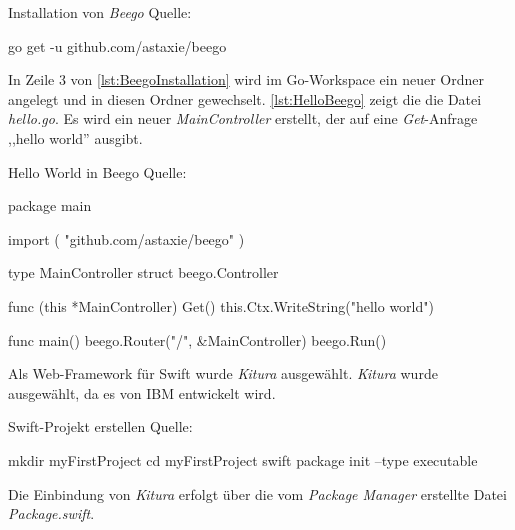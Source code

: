 \begin{listing}[H]
\caption{Installation von \textit{Beego} Quelle:\cite{Beego}}
\label{lst:BeegoInstallation}
\begin{Commandline}
go get -u github.com/astaxie/beego
\end{Commandline}
\end{listing}

In Zeile 3 von \autoref{lst:BeegoInstallation} wird im Go-Workspace ein neuer Ordner angelegt und in diesen Ordner gewechselt.
\autoref{lst:HelloBeego} zeigt die die Datei \textit{hello.go}. 
Es wird ein neuer \textit{MainController} erstellt, der auf eine \textit{Get}-Anfrage ,,hello world'' ausgibt.

\begin{listing}[H]
\caption{Hello World in Beego Quelle:\cite{Beego}}
\label{lst:HelloBeego}
\begin{GoCode}
package main

import (
    "github.com/astaxie/beego"
)

type MainController struct {
    beego.Controller
}

func (this *MainController) Get() {
    this.Ctx.WriteString("hello world")
}

func main() {
    beego.Router("/", &MainController{})
    beego.Run()
}
\end{GoCode}
\end{listing}



Als Web-Framework für Swift wurde \textit{Kitura} ausgewählt.
\textit{Kitura} wurde ausgewählt, da es von IBM entwickelt wird.

\begin{listing}[H]
\caption{Swift-Projekt erstellen Quelle:\cite{Kitura}}
\label{lst:KituraInstallation}
\begin{Commandline}
mkdir myFirstProject
cd myFirstProject
swift package init --type executable
\end{Commandline}
\end{listing}

Die Einbindung von \textit{Kitura} erfolgt über die vom \textit{Package Manager} erstellte Datei \textit{Package.swift}.

